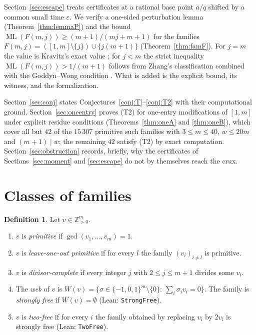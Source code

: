 \documentclass[11pt]{amsart}
\theoremstyle{plain}
\theoremstyle{definition}
\newtheorem{definition}[theorem]{Definition}
\theoremstyle{remark}
\newcommand{\ML}{\operatorname{ML}}
\newcommand{\Z}{\mathbb{Z}}
\newcommand{\lean}[1]{{\def\_{\textunderscore\allowbreak}\def\.{.\allowbreak}\texttt{#1}}}
\begin{document}
Section~\ref{sec:escape} treats certificates at a rational base point $a/q$ shifted by a common
small time $\varepsilon$. We verify a one-sided perturbation lemma (Theorem~\ref{thm:lemmaP}) and
the bound $\ML(F(m,j))\ge (m+1)/(mj+m+1)$ for the families
$F(m,j)=([1,m]\setminus\{j\})\cup\{j(m+1)\}$ (Theorem~\ref{thm:famF}). For $j=m$ the value is
Kravitz's exact value \cite[Thm.~5.1]{kravitz}; for $j<m$ the strict inequality
$\ML(F(m,j))>1/(m+1)$ follows from Zhang's classification \cite[Thm.~1.2]{zhang} combined with the
Goddyn--Wong condition \cite{gw}. What is added is the explicit bound, its witness, and the
formalization.

Section~\ref{sec:conj} states Conjectures~\ref{conj:T}--\ref{conj:T2} with their computational
ground. Section~\ref{sec:oneentry} proves (T2) for one-entry modifications of $[1,m]$ under
explicit residue conditions (Theorems~\ref{thm:oneA} and \ref{thm:oneB}), which cover all but
$42$ of the $15\,307$ primitive such families with $3\le m\le40$, $w\le 20m$ and $(m+1)\mid w$;
the remaining $42$ satisfy (T2) by exact computation. Section~\ref{sec:obstruction} records, briefly, why the certificates of
Sections~\ref{sec:moment} and \ref{sec:escape} do not by themselves reach the crux.

\section{Classes of families}\label{sec:classes}

\begin{definition}\label{def:classes}
Let $v\in\Z_{>0}^m$.
\begin{enumerate}
\item $v$ is \emph{primitive} if $\gcd(v_1,\dots,v_m)=1$.
\item $v$ is \emph{leave-one-out primitive} if for every $l$ the family $(v_i)_{i\ne l}$ is
primitive.
\item $v$ is \emph{divisor-complete} if every integer $j$ with $2\le j\le m+1$ divides some $v_i$.
\item The \emph{web} of $v$ is
$W(v)=\{\sigma\in\{-1,0,1\}^m\setminus\{0\}:\ \sum_i\sigma_iv_i=0\}$. The family is
\emph{strongly free} if $W(v)=\emptyset$ (Lean: \lean{StrongFree}).
\item $v$ is \emph{two-free} if for every $i$ the family obtained by replacing $v_i$ by $2v_i$ is
strongly free (Lean: \lean{TwoFree}).
\end{enumerate}
\end{definition}
\end{document}
